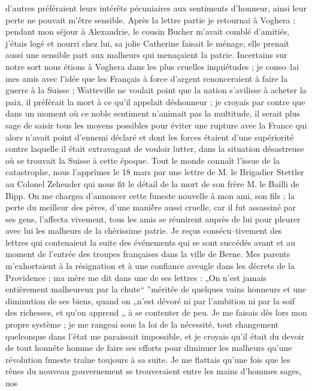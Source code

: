 \documentclass[12pt]{article}
\begin{document}
 d’autres préféraient leurs intérêts pécuniaires aux
sentiments d’honneur, ainsi leur perte ne pouvait m’être sensible. Après la lettre partie je
retournai à Voghera ; pendant mon séjour à Alexandrie, le cousin Bucher m’avait comblé d’amitiés,
j’étais logé et nourri chez lui, sa jolie Catherine faisait le ménage, elle prenait aussi une
sensible part aux malheurs qui menaçaient la patrie. Incertains sur notre sort nous étions à Voghera
dans les plus cruelles inquiétudes ; je conso–lai mes amis avec l’idée que les Français à force
d’argent renonceraient à faire la guerre à la Suisse ; Watteville ne voulait point que la nation
s’avilisse à acheter la paix, il préférait la mort à ce qu’il appelait déshonneur ; je croyais par
contre que dans un moment où ce noble sentiment n’animait pas la multitude, il serait plus sage de
saisir tous les moyens possibles pour éviter une rupture avec la France qui alors n’avait point
d’ennemi déclaré et dont les forces étaient d’une supériorité contre laquelle il était extravagant
de vouloir lutter, dans la situation désastreuse où se trouvait la Suisse à cette époque. Tout le
monde connaît l’issue de la catastrophe, nous l’apprîmes le 18 mars par une lettre de M. le
Brigadier Stettler au Colonel Zehender qui nous fit le détail de la mort de son frère M. le Bailli
de Bipp. On me chargea d’annoncer cette funeste nouvelle à mon ami, son fils ; la perte du meilleur
des pères, d’une maniè́re aussi cruelle, car il fut assassiné par ses gens, l’affecta vivement, tous
les amis se réunirent auprès de lui pour pleurer avec lui les malheurs de la chérissime patrie. Je
reçus consécu–tivement des lettres qui contenaient la suite des événements qui se sont succédés
avant et au moment de l’entrée des troupes françaises dans la ville de Berne. Mes parents
m’exhortaient à la résignation et à une confiance aveugle dans les décrets de la Providence ; ma
mère me dit dans une de ses lettres : „On n’est jamais entièrement malheureux par la chute“ ”méritée
de quelques vains honneurs et une diminution de ses biens, quand on „n’est dévoré ni par l’ambition
ni par la soif des richesses, et qu’on apprend „ à se contenter de peu. Je me faisais dès lors mon
propre système ; je me rangeai sous la loi de la nécessité, tout changement quelconque dans l’état
me paraissait impossible, et je croyais qu’il était du devoir de tout honnête homme de faire ses
efforts pour diminuer les malheurs qu’une révolution funeste traîne toujours à sa suite. Je me
flattais qu’une fois que les rênes du nouveau gouvernement se trouveraient entre les mains d’hommes
sages, nos
\end{document}
